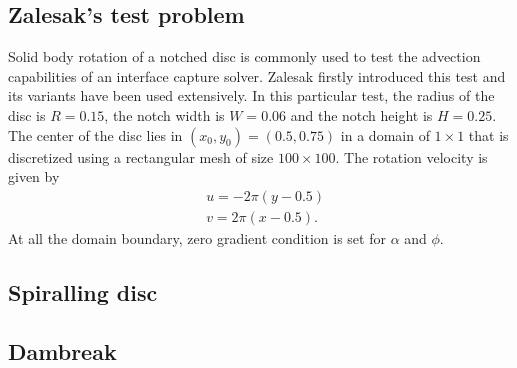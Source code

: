 \subsection{Zalesak's test problem}
Solid body rotation of a notched disc is commonly used to test the advection capabilities of an interface capture solver. Zalesak firstly introduced this test \citep{zalesak1979fully} and its variants have been used extensively. In this particular test, the radius of the disc is $R=0.15$, the notch width is $W=0.06$ and the notch height is $H=0.25$. The center of the disc lies in $(x_0,y_0)=(0.5,0.75)$ in a domain of $1\times{1}$ that is discretized using a rectangular mesh of size $100\times{100}$. The rotation velocity is given by 
\begin{equation}\label{27}
\begin{split}
&u=-2\pi(y-0.5)
\\
&v=2\pi(x-0.5).
\end{split}
\end{equation}
At all the domain boundary, zero gradient condition is set for $\alpha$ and $\phi$. 



\subsection{Spiralling disc}

\subsection{Dambreak}


